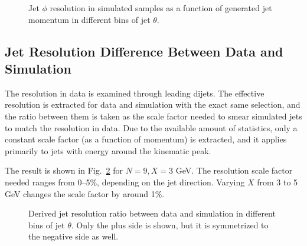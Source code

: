 \begin{figure}[htp!]
    \centering
    \caption{Jet $\phi$ resolution in simulated samples as a function of generated jet momentum in different bins of jet $\theta$.}
    \label{Figure:JetResolution-MCPhiResolution}
\end{figure}


\subsection{Jet Resolution Difference Between Data and Simulation}

The resolution in data is examined through leading dijets.  The effective resolution is extracted for data and simulation with the exact same selection, and the ratio between them is taken as the scale factor needed to smear simulated jets to match the resolution in data.  Due to the available amount of statistics, only a constant scale factor (as a function of momentum) is extracted, and it applies primarily to jets with energy around the kinematic peak.

The result is shown in Fig.~\ref{Figure:JetResolution-ResolutionScaleFactor} for $N = 9, X = 3$ GeV.  The resolution scale factor needed ranges from 0--5\%, depending on the jet direction.  Varying $X$ from 3 to 5 GeV changes the scale factor by around 1\%.

\begin{figure}[htp!]
    \centering
    \caption{Derived jet resolution ratio between data and simulation in different bins of jet $\theta$.  Only the plus side is shown, but it is symmetrized to the negative side as well.}
    \label{Figure:JetResolution-ResolutionScaleFactor}
\end{figure}


\clearpage